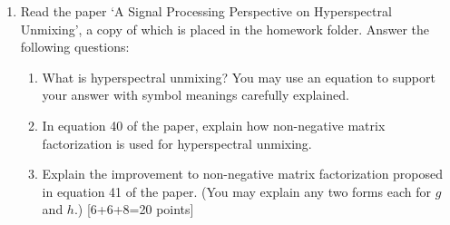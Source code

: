 \documentclass[11pt]{article}
\begin{document}
\begin{enumerate}
\item Read the paper `A Signal Processing Perspective on Hyperspectral Unmixing', a copy of which is placed in the homework folder. Answer the following questions:
\begin{enumerate}
\item What is hyperspectral unmixing? You may use an equation to support your answer with symbol meanings carefully explained.
\item In  equation 40 of the paper, explain how non-negative matrix factorization is used for hyperspectral unmixing. 
\item Explain the improvement to non-negative matrix factorization proposed in equation 41 of the paper. (You may explain any two forms each for $g$ and $h$.) \textsf{[6+6+8=20 points]}
\end{enumerate}

\end{enumerate}
\end{document}
